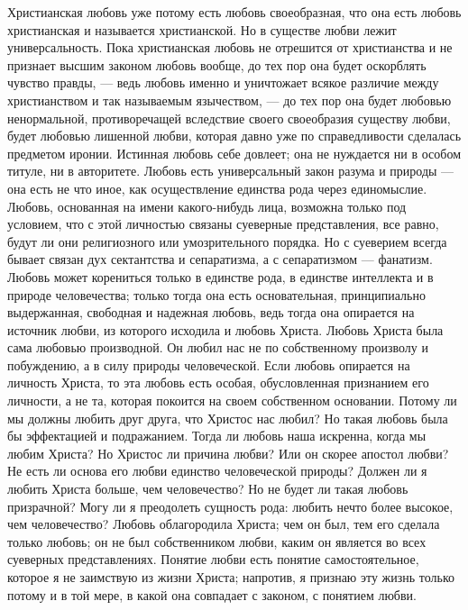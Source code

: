 \documentclass[12pt,oneside]{book}
\begin{document}
Христианская любовь уже потому есть любовь своеобразная, что она есть любовь христианская и называется христианской. Но в существе любви лежит универсальность. Пока христианская любовь не отрешится от христианства и не признает высшим законом любовь вообще, до тех пор она будет оскорблять чувство правды, --- ведь любовь именно и уничтожает всякое различие между христианством и так называемым язычеством, --- до тех пор она будет любовью ненормальной, противоречащей вследствие своего своеобразия существу любви, будет любовью лишенной любви, которая давно уже по справедливости сделалась предметом иронии. Истинная любовь себе довлеет; она не нуждается ни в особом титуле, ни в авторитете. Любовь есть универсальный закон разума и природы --- она есть не что иное, как осуществление единства рода через единомыслие. Любовь, основанная на имени какого-нибудь лица, возможна только под условием, что с этой личностью связаны суеверные представления, все равно, будут ли они религиозного или умозрительного порядка. Но с суеверием всегда бывает связан дух сектантства и сепаратизма, а с сепаратизмом --- фанатизм. Любовь может корениться только в единстве рода, в единстве интеллекта и в природе человечества; только тогда она есть основательная, принципиально выдержанная, свободная и надежная любовь, ведь тогда она опирается на источник любви, из которого исходила и любовь Христа. Любовь Христа была сама любовью производной. Он любил нас не по собственному произволу и побуждению, а в силу природы человеческой. Если любовь опирается на личность Христа, то эта любовь есть особая, обусловленная признанием его личности, а не та, которая покоится на своем собственном основании. Потому ли мы должны любить друг друга, что Христос нас любил? Но такая любовь была бы эффектацией и подражанием. Тогда ли любовь наша искренна, когда мы любим Христа? Но Христос ли причина любви? Или он скорее апостол любви? Не есть ли основа его любви единство человеческой природы? Должен ли я любить Христа больше, чем человечество? Но не будет ли такая любовь призрачной? Могу ли я преодолеть сущность рода: любить нечто более высокое, чем человечество? Любовь облагородила Христа; чем он был, тем его сделала только любовь; он не был собственником любви, каким он является во всех суеверных представлениях. Понятие любви есть понятие самостоятельное, которое я не заимствую из жизни Христа; напротив, я признаю эту жизнь только потому и в той мере, в какой она совпадает с законом, с понятием любви.
\end{document}
